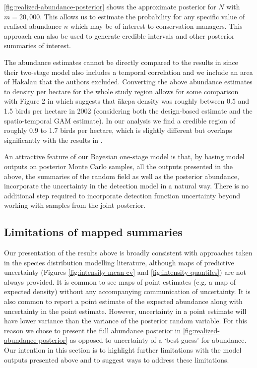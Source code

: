 \documentclass{statsoc}
\newcommand{\akepa}{\textquotesingle\={a}kepa}  %
\begin{document}
\autoref{fig:realized-abundance-posterior} shows the approximate posterior for $N$ with $m = 20,000$.  This allows us to estimate the probability for any specific value of realised abundance $n$ which may be of interest to conservation managers.  This approach can also be used to generate credible intervals and other posterior summaries of interest. 

The abundance estimates cannot be directly compared to the results in \cite{camp_dsm_2020} since their two-stage model also includes a temporal correlation and we include an area of Hakalau that the authors excluded.  Converting the above abundance estimates to density per hectare for the whole study region allows for some comparison with Figure 2 in \cite{camp_dsm_2020} which suggests that \akepa{} density was roughly between 0.5 and 1.5 birds per hectare in 2002 (considering both the design-based estimate and the spatio-temporal GAM estimate).  In our analysis we find a credible region of roughly 0.9 to 1.7 birds per hectare, which is slightly different but overlaps significantly with the results in \cite{camp_dsm_2020}.

An attractive feature of our Bayesian one-stage model is that, by basing model outputs on posterior Monte Carlo samples, all the outputs presented in the above, the summaries of the random field as well as the posterior abundance, incorporate the uncertainty in the detection model in a natural way.  There is no additional step required to incorporate detection function uncertainty beyond working with samples from the joint posterior.

\subsection{Limitations of mapped summaries}

Our presentation of the results above is broadly consistent with approaches taken in the species distribution modelling literature, although maps of predictive uncertainty (Figures \ref{fig:intensity-mean-cv} and \ref{fig:intensity-quantiles}) are not always provided.  It is common to see maps of point estimates (e.g. a map of expected density) without any accompanying communication of uncertainty.  It is also common to report a point estimate of the expected abundance along with uncertainty in the point estimate.  However, uncertainty in a point estimate will have lower variance than the variance of the posterior random variable.  For this reason we chose to present the full abundance posterior in \autoref{fig:realized-abundance-posterior} as opposed to uncertainty of a `best guess' for abundance.  Our intention in this section is to highlight further limitations with the model outputs presented above and to suggest ways to address these limitations. 
\end{document}
